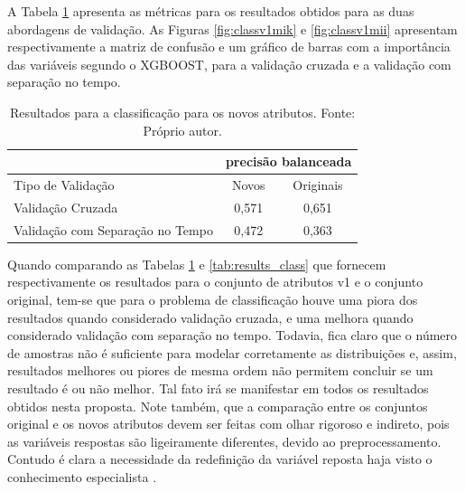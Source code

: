 A Tabela \ref{tab:results_v1_class} apresenta as métricas para os resultados obtidos para as duas abordagens de validação. As Figuras \ref{fig:classv1mik} e \ref{fig:classv1mii} apresentam respectivamente a matriz de confusão e um gráfico de barras com a importância das variáveis segundo o XGBOOST, para a validação cruzada e a validação com separação no tempo.

\begin{table}[h]
\begin{center}
\begin{tabular}{|l|c|c|}
\cline{2-3}
\multicolumn{1}{l}{}&\multicolumn{2}{|c|}{precisão balanceada}\\ \hline
Tipo de Validação                   &  Novos    & Originais \\ \hline
Validação Cruzada                   & 0,571     & 0,651 \\ \hline
Validação com Separação no Tempo    & 0,472     & 0,363 \\ \hline
\end{tabular}
\end{center}
\vspace{12pt}
\caption{Resultados para a classificação para os novos atributos. Fonte: Próprio autor.}
\label{tab:results_v1_class}
\end{table}

Quando comparando as Tabelas \ref{tab:results_v1_class} e \ref{tab:results_class} que fornecem respectivamente os resultados para o conjunto de atributos v1 e o conjunto original, tem-se que para o problema de classificação houve uma piora dos resultados quando considerado validação cruzada, e uma melhora quando considerado validação com separação no tempo. Todavia, fica claro que o número de amostras não é suficiente para modelar corretamente as distribuições e, assim, resultados melhores ou piores de mesma ordem não permitem concluir se um resultado é ou não melhor. Tal fato irá se manifestar em todos os resultados obtidos nesta proposta. Note também, que a comparação entre os conjuntos original e os novos atributos devem ser feitas com olhar rigoroso e indireto, pois as variáveis respostas são ligeiramente diferentes, devido ao preprocessamento. Contudo é clara a necessidade da redefinição da variável reposta haja visto o conhecimento especialista \cite{MUELLA:2008}.

